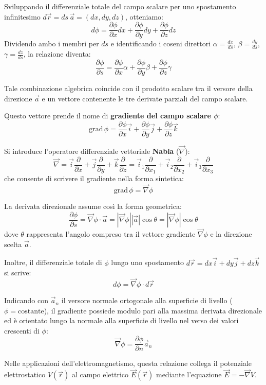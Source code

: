 \documentclass[12pt, a4paper]{article}
\begin{document}
Sviluppando il differenziale totale del campo scalare per uno spostamento infinitesimo $d\vec{r} = ds \, \vec{a} = (dx, dy, dz)$, otteniamo:
\[
d\phi = \frac{\partial \phi}{\partial x} dx + \frac{\partial \phi}{\partial y} dy + \frac{\partial \phi}{\partial z} dz
\]
Dividendo ambo i membri per $ds$ e identificando i coseni direttori $\alpha = \frac{dx}{ds}$, $\beta = \frac{dy}{ds}$, $\gamma = \frac{dz}{ds}$, la relazione diventa:
\[
\frac{\partial \phi}{\partial s} = \frac{\partial \phi}{\partial x}\alpha + \frac{\partial \phi}{\partial y}\beta + \frac{\partial \phi}{\partial z}\gamma
\]

Tale combinazione algebrica coincide con il prodotto scalare tra il versore della direzione $\vec{a}$ e un vettore contenente le tre derivate parziali del campo scalare.

Questo vettore prende il nome di \textbf{gradiente del campo scalare $\phi$}:
\[
\text{grad}\,\phi = \frac{\partial \phi}{\partial x}\vec{i} + \frac{\partial \phi}{\partial y}\vec{j} + \frac{\partial \phi}{\partial z}\vec{k}
\]

Si introduce l'operatore differenziale vettoriale \textbf{Nabla} ($\vec{\nabla}$):
\[
\vec{\nabla} = \vec{i}\frac{\partial}{\partial x} + \vec{j}\frac{\partial}{\partial y} + \vec{k}\frac{\partial}{\partial z} = \vec{i}_1\frac{\partial}{\partial x_1} + \vec{i}_2\frac{\partial}{\partial x_2} + \vec{i}_3\frac{\partial}{\partial x_3}
\]
che consente di scrivere il gradiente nella forma sintetica:
\[
\text{grad}\,\phi = \vec{\nabla}\phi
\]

La derivata direzionale assume così la forma geometrica:
\[
\frac{\partial \phi}{\partial s} = \vec{\nabla}\phi \cdot \vec{a} = |\vec{\nabla}\phi| |\vec{a}| \cos\theta = |\vec{\nabla}\phi| \cos\theta
\]
dove $\theta$ rappresenta l'angolo compreso tra il vettore gradiente $\vec{\nabla}\phi$ e la direzione scelta $\vec{a}$.

Inoltre, il differenziale totale di $\phi$ lungo uno spostamento $d\vec{r} = dx \vec{i} + dy \vec{j} + dz \vec{k}$ si scrive:
\[
d\phi = \vec{\nabla}\phi \cdot d\vec{r}
\]

Indicando con $\vec{a}_n$ il versore normale ortogonale alla superficie di livello ($\phi = \text{costante}$), il gradiente possiede modulo pari alla massima derivata direzionale ed è orientato lungo la normale alla superficie di livello nel verso dei valori crescenti di $\phi$:
\[
\vec{\nabla}\phi = \frac{\partial \phi}{\partial n} \vec{a}_n
\]

Nelle applicazioni dell'elettromagnetismo, questa relazione collega il potenziale elettrostatico $V(\vec{r})$ al campo elettrico $\vec{E}(\vec{r})$ mediante l'equazione $\vec{E} = -\vec{\nabla}V$.
\end{document}
